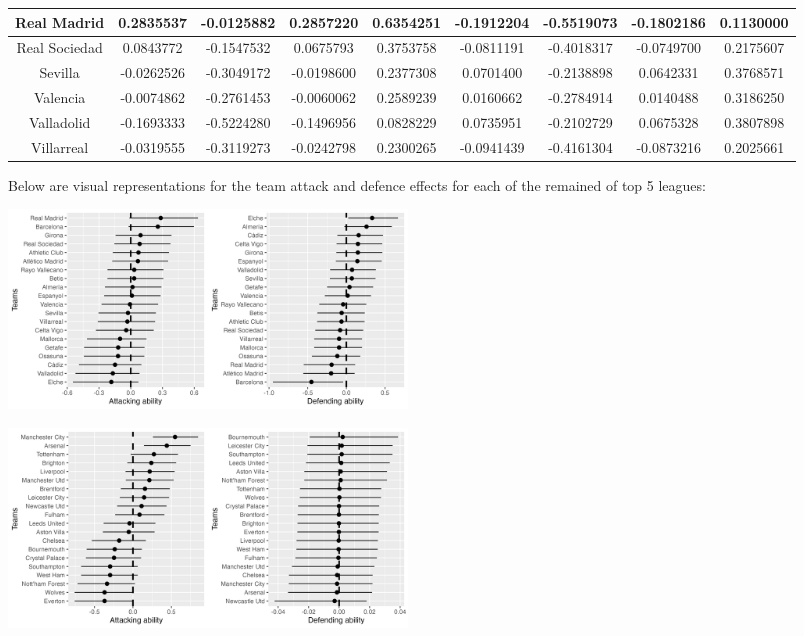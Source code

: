 \documentclass[
]{article}
\begin{document}
\begin{table}
{\begin{tabular}[t]{c|c|c|c|c|c|c|c|c}
\hline
Real Madrid & 0.2835537 & -0.0125882 & 0.2857220 & 0.6354251 & -0.1912204 & -0.5519073 & -0.1802186 & 0.1130000\\
\hline
Real Sociedad & 0.0843772 & -0.1547532 & 0.0675793 & 0.3753758 & -0.0811191 & -0.4018317 & -0.0749700 & 0.2175607\\
\hline
Sevilla & -0.0262526 & -0.3049172 & -0.0198600 & 0.2377308 & 0.0701400 & -0.2138898 & 0.0642331 & 0.3768571\\
\hline
Valencia & -0.0074862 & -0.2761453 & -0.0060062 & 0.2589239 & 0.0160662 & -0.2784914 & 0.0140488 & 0.3186250\\
\hline
Valladolid & -0.1693333 & -0.5224280 & -0.1496956 & 0.0828229 & 0.0735951 & -0.2102729 & 0.0675328 & 0.3807898\\
\hline
Villarreal & -0.0319555 & -0.3119273 & -0.0242798 & 0.2300265 & -0.0941439 & -0.4161304 & -0.0873216 & 0.2025661\\
\hline
\end{tabular}}
\end{table}

Below are visual representations for the team attack and defence effects
for each of the remained of top 5 leagues:

\begin{center}\includegraphics[width=400px]{llattdef} \end{center}

\begin{center}\includegraphics[width=400px]{plattdef} \end{center}
\end{document}
